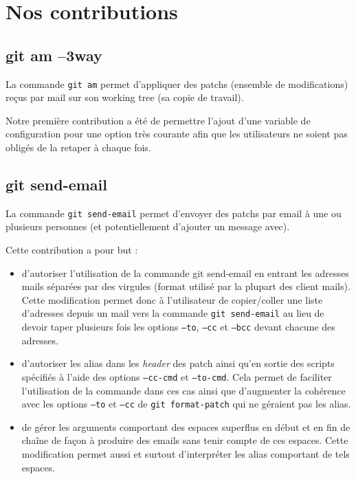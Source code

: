 \documentclass[a4paper, 12pt]{article}
\newcommand{\gitcmd}[1]{\texttt{#1}}
\newcommand{\tech}[1]{\emph{#1}}
\begin{document}
\section{Nos contributions}

\subsection{git am --3way}

La commande \gitcmd{git am} permet d'appliquer des patchs (ensemble de
modifications) reçus par mail sur son working tree (sa copie de
travail).

Notre première contribution a été de permettre l'ajout d'une variable de configuration pour une option très courante afin que les utilisateurs ne soient pas obligés de la retaper à chaque fois.

\subsection{git send-email}

La commande \gitcmd{git send-email} permet d'envoyer des patchs par
email à une ou plusieurs
personnes (et potentiellement d'ajouter un message avec).

Cette contribution a pour but :

\begin{itemize}
\item d'autoriser l'utilisation de la commande git send-email en entrant
  les adresses mails séparées par des virgules (format
  utilisé par la plupart des client mails). Cette modification permet
  donc à l'utilisateur de copier/coller une liste d'adresses depuis un
  mail vers la commande \gitcmd{git send-email} au lieu de devoir
  taper plusieurs fois les options \gitcmd{--to}, \gitcmd{--cc} et
  \gitcmd{--bcc} devant chacune des adresses. 
\item d'autoriser les alias dans les \tech{header} des patch ainsi qu'en
  sortie des scripts spécifiés à l'aide des options \gitcmd{--cc-cmd}
  et \gitcmd{--to-cmd}. Cela permet de faciliter l'utilisation de la
  commande dans ces cas ainsi que d'augmenter la cohérence avec
  les options \gitcmd{--to} et \gitcmd{--cc} de \gitcmd{git format-patch} 
  qui ne géraient pas les alias.
\item de gérer les arguments comportant des espaces superflus en début et
  en fin de chaîne de façon à produire des emails sans tenir compte de ces
  espaces. Cette modification permet aussi et surtout d'interpréter
  les alias comportant de tels espaces. 
\end{itemize}
\end{document}
